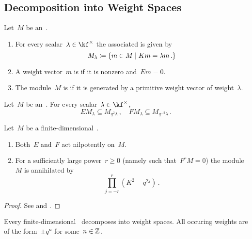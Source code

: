 \documentclass[a4paper, 11pt, oneside]{scrartcl}
\begin{document}
\subsection{Decomposition into Weight Spaces}

\begin{definition}
  Let~$M$ be an~.
  \begin{enumerate}
    \item
      For every scalar~$\lambda \in \kf^{\times}$ the associated  is given by
      \[
        M_\lambda
        \defined
        \{
          m \in M
        \suchthat
          K m = \lambda m \,.
        \}
      \]
    \item
      A weight vector~$m$ is  if it is nonzero and~$Em = 0$.
    \item
      The module~$M$ is  if it is generated by a primitive weight vector of weight~$\lambda$.
  \end{enumerate}
\end{definition}

\begin{proposition}
  Let~$M$ be an~.
  For every scalar~$\lambda \in \kf^{\times}$,
  \[
    E M_\lambda \subseteq M_{q^2 \lambda} \,,
    \quad
    F M_\lambda \subseteq M_{q^{-2} \lambda} \,.
  \]
\end{proposition}

\begin{lemma}
  \label{action on finite dimensional modules}
  Let~$M$ be a finite-dimensional~.
  \begin{enumerate}
    \item
      Both~$E$ and~$F$ act nilpotently on~$M$.
    \item
      For a sufficiently large power~$r \geq 0$ (namely such that~$F^r M = 0$) the module~$M$ is annihilated by
      \[
        \prod_{j = -r}^r (K^2 - q^{2j}) \,.
      \]
  \end{enumerate}
\end{lemma}

\begin{proof}
  See \cite[Proposition~2.1]{jantzen_quantum} and \cite[Proposition~2.3]{jantzen_quantum}.
\end{proof}

\begin{proposition}
  Every finite-dimensional~ decomposes into weight spaces.
  All occuring weights are of the form~$\pm q^n$ for some~$n \in \mathbb{Z}$.
\end{proposition}
\end{document}
